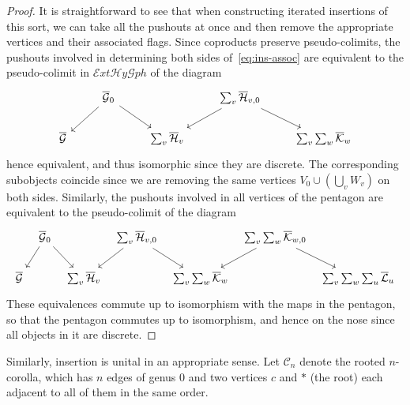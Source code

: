 \documentclass{article}
\theoremstyle{definition}
\theoremstyle{remark}
\def\C{\mathcal{C}}
\def\ehy{\mathcal{E}\mathit{xt}\mathcal{H}\mathit{y}\mathcal{G}\mathit{ph}}
\def\Gbar{\overline{\mathcal{G}}}
\def\Hbar{\overline{\mathcal{H}}}
\def\Kbar{\overline{\mathcal{K}}}
\def\Lbar{\overline{\mathcal{L}}}
\begin{document}
\begin{proof}
  It is straightforward to see that when constructing iterated insertions of this sort, we can take all the pushouts at once and then remove the appropriate vertices and their associated flags.
  Since coproducts preserve pseudo-colimits, the pushouts involved in determining both sides of~\eqref{eq:ins-assoc} are equivalent to the pseudo-colimit in $\ehy$ of the diagram
  \[
  \begin{tikzcd}
    & \Gbar_0 \ar[dl] \ar[dr] & & \sum_v \Hbar_{v,0} \ar[dr] \ar[dl]\\
    \Gbar && \sum_v \Hbar_v  && \sum_v\sum_w \Kbar_w
  \end{tikzcd}
  \]
  hence equivalent, and thus isomorphic since they are discrete.
  The corresponding subobjects coincide since we are removing the same vertices $V_0 \cup (\bigcup_v W_v)$ on both sides.
  Similarly, the pushouts involved in all vertices of the pentagon are equivalent to the pseudo-colimit of the diagram
  \[
  \begin{tikzcd}[column sep=tiny]
    & \Gbar_0 \ar[dl] \ar[dr] & & \sum_v \Hbar_{v,0} \ar[dr] \ar[dl] && \sum_v\sum_w \Kbar_{w,0} \ar[dl]\ar[dr]\\
    \Gbar && \sum_v \Hbar_v  && \sum_v\sum_w\Kbar_w && \sum_v \sum_w \sum_u \Lbar_u
  \end{tikzcd}
  \]
  These equivalences commute up to isomorphism with the maps in the pentagon, so that the pentagon commutes up to isomorphism, and hence on the nose since all objects in it are discrete.
\end{proof}

Similarly, insertion is unital in an appropriate sense.
Let $\C_n$ denote the rooted $n$-corolla, which has $n$ edges of genus 0 and two vertices $c$ and $\ast$ (the root) each adjacent to all of them in the same order.
\end{document}

